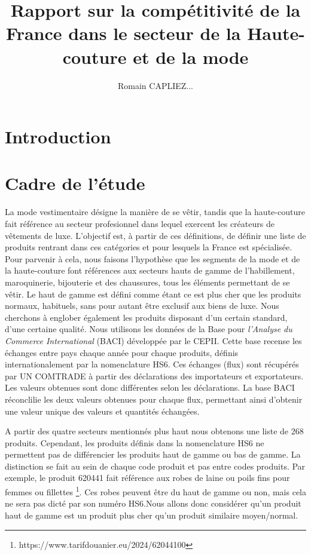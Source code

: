 \documentclass[french,10pt,a4paper]{article}
\title{Rapport sur la compétitivité de la France dans le secteur de la Haute-couture et de la mode}
\author{Romain CAPLIEZ...}
\begin{document}
\maketitle

\section{Introduction}

\newpage

\section{Cadre de l'étude}

La mode vestimentaire désigne la manière de se vêtir, tandis que la haute-couture fait référence au secteur profesionnel dans lequel exercent les créateurs de vêtements de luxe. L'objectif est, à partir de ces définitions, de définir une liste de produits rentrant dans ces catégories et pour lesquels la France est spécialisée. Pour parvenir à cela, nous faisons l'hypothèse que les segments de la mode et de la haute-couture font références aux secteurs hauts de gamme de l'habillement, maroquinerie, bijouterie et des chaussures, tous les éléments permettant de se vêtir. Le haut de gamme est défini comme étant ce est plus cher que les produits normaux, habituels, sans pour autant être exclusif aux biens de luxe. Nous cherchons à englober également les produits disposant d'un certain standard, d'une certaine qualité. Nous utilisons les données de la Base pour \textit{l'Analyse du Commerce International} (BACI) \cite{Gaulier2010} développée par le CEPII. Cette base recense les échanges entre pays chaque année pour chaque produits, définis internationalement par la nomenclature HS6. Ces échanges (flux) sont récupérés par UN COMTRADE à partir des déclarations des importateurs et exportateurs. Les valeurs obtenues sont donc différentes selon les déclarations. La base BACI réconclilie les deux valeurs obtenues pour chaque flux, permettant ainsi d'obtenir une valeur unique des valeurs et quantités échangées.  

A partir des quatre secteurs mentionnés plus haut nous obtenons une liste de 268 produits. Cependant, les produits définis dans la nomenclature HS6 ne permettent pas de différencier les produits haut de gamme ou bas de gamme. La distinction se fait au sein de chaque code produit et pas entre codes produits. Par exemple, le produit 620441 fait référence aux \og robes de laine ou poils fins pour femmes ou fillettes\fg{} \footnote{https://www.tarifdouanier.eu/2024/62044100}. Ces robes peuvent être du haut de gamme ou non, mais cela ne sera pas dicté par son numéro HS6.Nous allons donc considérer qu'un produit haut de gamme est un produit plus cher qu'un produit similaire moyen/normal.
\end{document}
